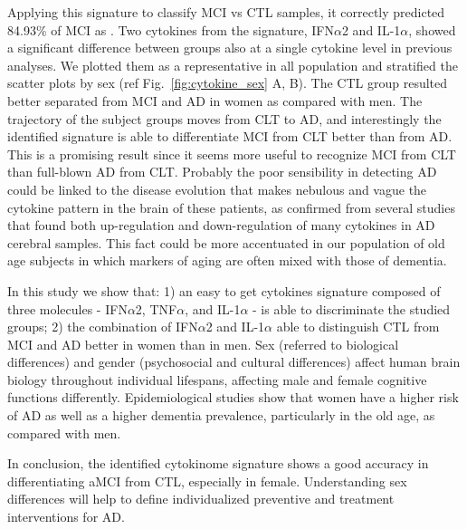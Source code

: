 \documentclass{standalone}
\begin{document}
Applying this signature to classify MCI vs CTL samples, it correctly predicted 84.93\% of MCI as .
Two cytokines from the signature, IFN$\alpha$2 and IL-1$\alpha$, showed a significant difference between groups also at a single cytokine level in previous analyses.
We plotted them as a representative in all population and stratified the scatter plots by sex (ref Fig.~\ref{fig:cytokine_sex} A, B).
The CTL group resulted better separated from MCI and AD in women as compared with men.
The trajectory of the subject groups moves from CLT to AD, and interestingly the identified signature is able to differentiate MCI from CLT better than from AD.
This is a promising result since it seems more useful to recognize MCI from CLT than full-blown AD from CLT.
Probably the poor sensibility in detecting AD could be linked to the disease evolution that makes nebulous and vague the cytokine pattern in the brain of these patients, as confirmed from several studies that found both up-regulation and down-regulation of many cytokines in AD cerebral samples.
This fact could be more accentuated in our population of old age subjects in which markers of aging are often mixed with those of dementia.

In this study we show that: 1) an easy to get cytokines signature composed of three molecules - IFN$\alpha$2, TNF$\alpha$, and IL-1$\alpha$ - is able to discriminate the studied groups;  2) the combination of IFN$\alpha$2 and IL-1$\alpha$ able to distinguish CTL from  MCI and AD better in women than in men.
Sex (referred to biological differences) and gender (psychosocial and cultural differences) affect human brain biology throughout individual lifespans, affecting male and female cognitive functions differently.
Epidemiological studies show that women have a higher risk of AD as well as a higher dementia prevalence, particularly in the old age, as compared with men.

In conclusion, the identified cytokinome signature shows a good accuracy in differentiating aMCI from CTL, especially in female.
Understanding sex differences will help to define individualized preventive and treatment interventions for AD.
\end{document}
